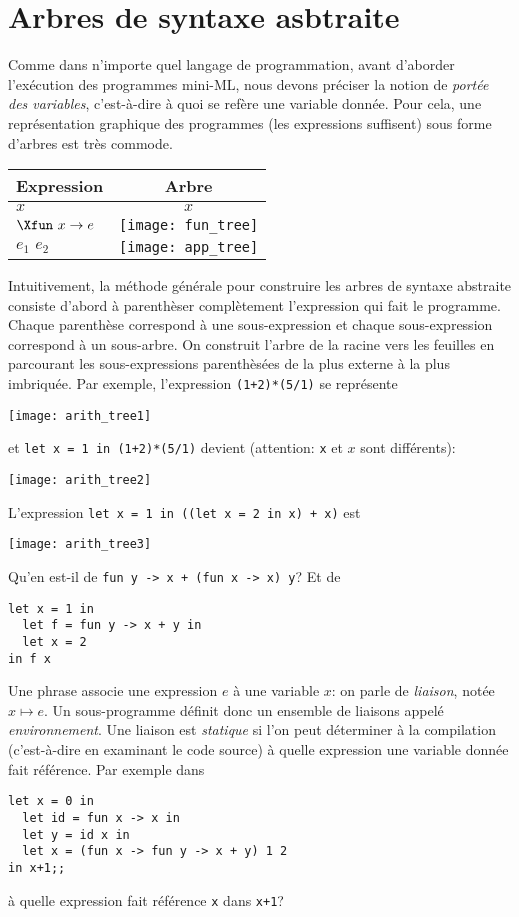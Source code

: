 \section{Arbres de syntaxe asbtraite}

\label{arbres_de_prog}

Comme dans n'importe quel langage de programmation, avant d'aborder l'exécution des programmes mini-ML, nous devons préciser la notion de \emph{portée des variables}, c'est-à-dire à quoi se refère une variable donnée. Pour cela, une représentation graphique des programmes (les expressions suffisent) sous forme d'arbres est très commode.
\begin{center}
\begin{tabular}{l|c}
    Expression & Arbre\\
 \hline
    $x$
  & $x$\\
    $\Xfun \,\, x \rightarrow e$
  & \texttt{[image: fun\_tree]}\\
    $e_1 \,\, e_2$ 
  & \texttt{[image: app\_tree]}
\end{tabular}
\end{center}

Intuitivement, la méthode générale pour construire les arbres de syntaxe abstraite consiste d'abord à parenthèser complètement l'expression qui fait le programme. Chaque parenthèse correspond à une sous-expression et chaque sous-expression correspond à un sous-arbre. On construit l'arbre de la racine vers les feuilles en parcourant les sous-expressions parenthèsées de la plus externe à la plus imbriquée. Par exemple, l'expression \verb|(1+2)*(5/1)| se représente
\begin{center}
\texttt{[image: arith\_tree1]}
\end{center}
et \verb|let x = 1 in (1+2)*(5/1)| devient (attention: \verb+x+ et $x$
sont différents):
\begin{center}
\texttt{[image: arith\_tree2]}
\end{center}
L'expression \verb|let x = 1 in ((let x = 2 in x) + x)| est
\begin{center}
\texttt{[image: arith\_tree3]}
\end{center}
Qu'en est-il de \verb|fun y -> x + (fun x -> x) y|? Et de
{\small
\begin{verbatim}
let x = 1 in
  let f = fun y -> x + y in
  let x = 2
in f x
\end{verbatim}
}


Une phrase associe une expression $e$ à une variable $x$: on parle de
\emph{liaison}, notée $x \mapsto e$. Un sous-programme définit donc un
ensemble de liaisons appelé \emph{environnement}. Une liaison est
\emph{statique} si l'on peut déterminer à la compilation (c'est-à-dire
en examinant le code source) à quelle expression une variable donnée
fait référence. Par exemple dans {\small
\begin{verbatim}
let x = 0 in
  let id = fun x -> x in
  let y = id x in
  let x = (fun x -> fun y -> x + y) 1 2 
in x+1;;
\end{verbatim}
}
à quelle expression fait référence \verb+x+ dans \verb|x+1|?

